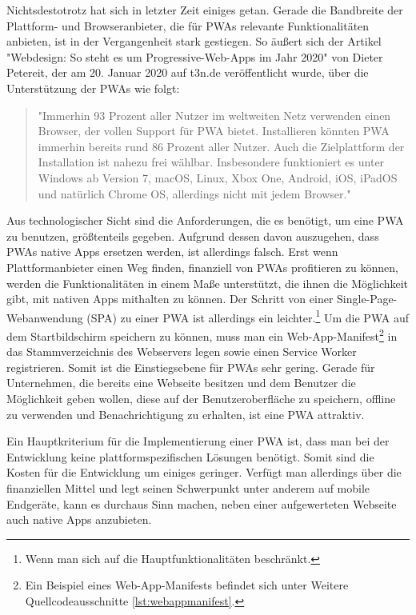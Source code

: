 \mbox{Nichtsdestotrotz} hat sich in letzter Zeit einiges getan.
Gerade die Bandbreite der Plattform- und Browseranbieter, die für PWAs relevante
Funktionalitäten anbieten, ist in der Vergangenheit stark gestiegen. So äußert sich der Artikel
"Webdesign: So steht es um Progressive-Web-Apps im Jahr 2020" von Dieter Petereit,
der am 20. Januar 2020 auf t3n.de veröffentlicht wurde, über die Unterstützung der PWAs wie folgt:

\begin{quote}
"Immerhin 93 Prozent aller Nutzer im weltweiten Netz verwenden einen Browser, der vollen Support
für PWA bietet. Installieren könnten PWA immerhin bereits rund 86 Prozent aller Nutzer. Auch
die Zielplattform der Installation ist nahezu frei wählbar. Insbesondere funktioniert es
unter Windows ab Version 7, macOS, Linux, Xbox One, Android, iOS, iPadOS und natürlich Chrome OS,
allerdings nicht mit jedem Browser."\cite{T3NPWASupport}
\end{quote}

Aus technologischer Sicht sind die
Anforderungen, die es benötigt, um eine PWA zu benutzen, größtenteils gegeben.
Aufgrund dessen davon auszugehen, dass PWAs native Apps ersetzen werden, ist allerdings
falsch. Erst wenn Plattformanbieter einen Weg finden, finanziell von PWAs profitieren
zu können, werden die Funktionalitäten in einem Maße unterstützt, die ihnen die Möglichkeit
gibt, mit nativen Apps mithalten zu können. Der Schritt von einer Single-Page-Webanwendung (SPA) zu einer
PWA ist allerdings ein leichter.\footnote{Wenn man sich auf die Hauptfunktionalitäten beschränkt.}
Um die PWA auf dem Startbildschirm speichern zu können, muss man ein Web-App-Manifest\footnote{
Ein Beispiel eines Web-App-Manifests befindet sich unter Weitere Quellcodeausschnitte \ref{lst:webappmanifest}.}
in das Stammverzeichnis des Webservers legen sowie einen Service Worker registrieren.
Somit ist die Einstiegsebene für PWAs sehr gering. Gerade für Unternehmen,
die bereits eine Webseite besitzen und dem Benutzer die Möglichkeit geben wollen,
diese auf der Benutzeroberfläche zu speichern, offline zu verwenden und Benachrichtigung zu erhalten,
ist eine PWA attraktiv.

Ein Hauptkriterium für die Implementierung einer PWA ist, dass man bei der Entwicklung
keine plattformspezifischen Lösungen benötigt. Somit sind die Kosten für die Entwicklung um einiges
geringer. Verfügt man allerdings über die finanziellen Mittel und legt seinen Schwerpunkt unter anderem
auf mobile Endgeräte, kann es durchaus Sinn machen, neben einer aufgewerteten Webseite
auch native Apps anzubieten.

